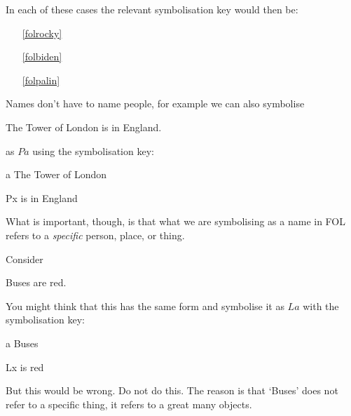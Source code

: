 In each of these cases the relevant symbolisation key would then be: 
\begin{enumerate}
\item[\ref{folrocky}] 
\item[\ref{folbiden}] 
\item[\ref{folpalin}] 
\end{enumerate}
Names don't have to name people, for example we can also symbolise
\begin{earg}
\item[\ex{foltower}] The Tower of London is in England.
\end{earg}
as $Pa$ using the symbolisation key:
\begin{ekey}
\item[a] The Tower of London
\item[Px]  is in England
\end{ekey}
What is important, though, is that what we are symbolising as a name in FOL refers to a \emph{specific} person, place, or thing.

Consider
\begin{earg}
\item[\ex{folbuses}] Buses are red.
\end{earg}
You might think that this has the same form and symbolise it as $La$ with the symbolisation key:
\begin{ekey}
\item[a] Buses
\item[Lx]  is red
\end{ekey}
But this would be wrong. Do not do this. The reason  is that `Buses' does not refer to a specific thing, it refers to a great many objects.

